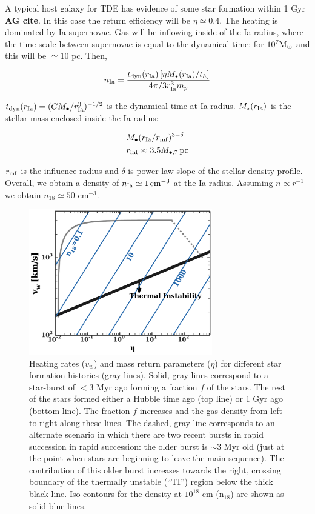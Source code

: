 \documentclass[usenatbib,fleqn]{mnras}
\newcommand{\Mbh}[1][]{M_{\bullet#1}}
\newcommand{\Msun}{{\rm M_\odot}}
\begin{document}
A typical host galaxy for TDE has evidence of some star formation
within 1 Gyr {\bf AG cite}. In this case the return efficiency will be
$\eta\simeq 0.4$. The heating is dominated by Ia supernovae.  Gas will
be inflowing inside of the Ia radius, where the time-scale between
supernovae is equal to the dynamical time: for $10^7 \Msun$ and this
will be $\simeq 10$ pc. Then,

\begin{equation}
n_{\rm Ia}=\frac{t_{\rm dyn}(r_{\rm Ia}) \left[\eta M_{\star} (r_{\rm
    Ia})/t_h\right]}{4 \pi/3 r_{\rm Ia}^3 m_p}
\label{eq:nIa}
\end{equation}

$t_{\rm dyn}(r_{\rm Ia})=(G \Mbh/r_{\rm Ia}^3)^{-1/2}$ is the
dynamical time at Ia radius. $M_{\star}(r_{\rm Ia})$ is the stellar
mass enclosed inside the Ia radius:

\begin{align}
&\Mbh (r_{\rm Ia}/r_{\rm inf})^{3-\delta}\\
&r_{\inf}\approx 3.5 \Mbh[,7] \, {\rm pc}
\end{align}

$r_{\rm inf}$ is the influence radius and $\delta$
is power law slope of the stellar density profile. Overall, we obtain
a density of $n_{\rm Ia} \simeq 1 \, {\rm cm}^{-3}$ at the Ia
radius. Assuming $n\propto r^{-1}$ we obtain $n_{18}\simeq 50$ cm$^{-3}$. 

 

\begin{figure} 
  \includegraphics[width=8cm]{cnm_plot.pdf}
  \caption{\label{fig:param} Heating rates ($v_w$) and mass return
    parameters ($\eta$) for different star formation histories (gray
    lines). Solid, gray lines correspond to a star-burst of $<3$ Myr
    ago forming a fraction $f$ of the stars. The rest of the stars
    formed either a Hubble time ago (top line) or 1 Gyr ago (bottom
    line). The fraction $f$ increases and the gas density from left to
    right along these lines. The dashed, gray line corresponds to an
    alternate scenario in which there are two recent bursts in rapid
    succession in rapid succession: the older burst is $\sim 3$ Myr
    old (just at the point when stars are beginning to leave the main
    sequence). The contribution of this older burst increases towards
    the right, crossing boundary of the thermally unstable (``TI'')
    region below the thick black line. Iso-contours for the density at
    $10^{18}$ cm ($\mathrm{n_{18}}$) are shown as solid blue lines.} 
\end{figure}
\end{document}
